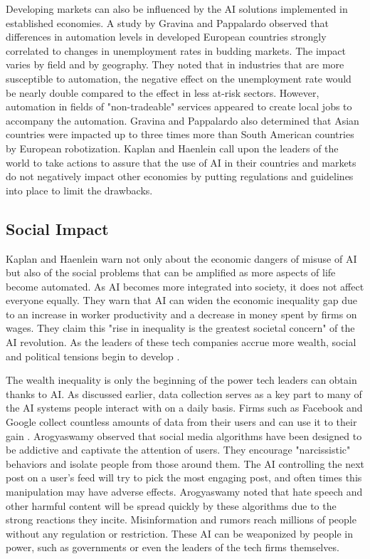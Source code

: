 \documentclass[12pt, man]{apa6}
\begin{document}
Developing markets can also be influenced by the AI solutions implemented in established economies.  A study by Gravina and Pappalardo \parencite*{Gravina2022} observed that differences in automation levels in developed European countries strongly correlated to changes in unemployment rates in budding markets.  The impact varies by field and by geography.  They noted that in industries that are more susceptible to automation, the negative effect on the unemployment rate would be nearly double compared to the effect in less at-risk sectors.  However, automation in fields of "non-tradeable" services appeared to create local jobs to accompany the automation. Gravina and Pappalardo also determined that Asian countries were impacted up to three times more than South American countries by European robotization.  Kaplan and Haenlein \parencite*{Kaplan2020} call upon the leaders of the world to take actions to assure that the use of AI in their countries and markets do not negatively impact other economies by putting regulations and guidelines into place to limit the drawbacks.

\subsection*{Social Impact}
Kaplan and Haenlein \parencite*{Kaplan2020} warn not only about the economic dangers of misuse of AI but also of the social problems that can be amplified as more aspects of life become automated.  As AI becomes more integrated into society, it does not affect everyone equally.  They warn that AI can widen the economic inequality gap due to an increase in worker productivity and a decrease in money spent by firms on wages.  They claim this "rise in inequality is the greatest societal concern" of the AI revolution.  As the leaders of these tech companies accrue more wealth, social and political tensions begin to develop \parencite{Arogyaswamy2020}.

The wealth inequality is only the beginning of the power tech leaders can obtain thanks to AI.  As discussed earlier, data collection serves as a key part to many of the AI systems people interact with on a daily basis.  Firms such as Facebook and Google collect countless amounts of data from their users and can use it to their gain \parencite{Arogyaswamy2020}.  Arogyaswamy \parencite*{Arogyaswamy2020} observed that social media algorithms have been designed to be addictive and captivate the attention of users.  They encourage "narcissistic" behaviors and isolate people from those around them.  The AI controlling the next post on a user's feed will try to pick the most engaging post, and often times this manipulation may have adverse effects.  Arogyaswamy \parencite*{Arogyaswamy2020} noted that hate speech and other harmful content will be spread quickly by these algorithms due to the strong reactions they incite.  Misinformation and rumors reach millions of people without any regulation or restriction.  These AI can be weaponized by people in power, such as governments or even the leaders of the tech firms themselves.
\end{document}
